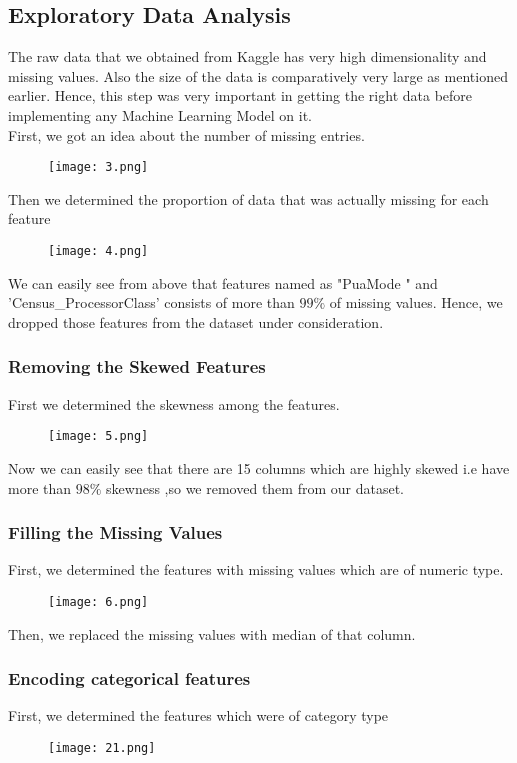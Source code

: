 \documentclass[conference]{IEEEtran}
\begin{document}
\subsection{Exploratory Data Analysis}
The raw data that we obtained from Kaggle has very high dimensionality and missing values. Also the size of the data is comparatively very large as mentioned earlier. Hence, this step was very important in getting the right data before implementing any Machine Learning Model on it.\\
First, we got an idea about the number of missing entries.
\begin{figure}[H]
    \centering
    \texttt{[image: 3.png]}
\end{figure}

Then we determined the proportion of data that was actually missing for each feature
\begin{figure}[H]
    \centering
    \texttt{[image: 4.png]}
\end{figure}

We can easily see from above that features named as "PuaMode " and 'Census\_ProcessorClass' consists of more than $99 \%$ of missing values. Hence, we dropped those features from the dataset under consideration.

\subsubsection{Removing the Skewed Features}
First we determined the skewness among the features.
\begin{figure}[H]
    \centering
    \texttt{[image: 5.png]}
\end{figure}

Now we can easily see that there are 15 columns which are highly skewed i.e have more than $98 \%$ skewness ,so we removed them from our dataset.

\subsubsection{Filling the Missing Values}
First, we determined the features with missing values which are of numeric type.
\begin{figure}[H]
    \centering
    \texttt{[image: 6.png]}
\end{figure}

Then, we replaced the missing values with median of that column.
\subsubsection{Encoding categorical features}
First, we determined the features which were of category type
\begin{figure}[H]
    \centering
    \texttt{[image: 21.png]}
\end{figure}
\end{document}

